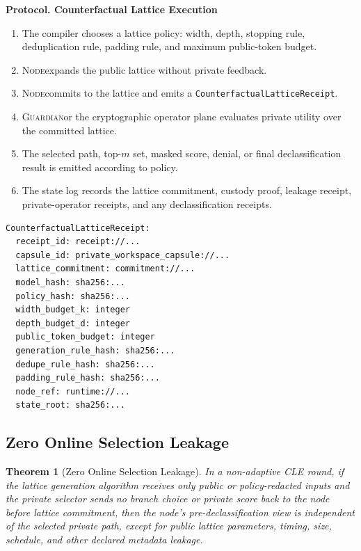 \documentclass[11pt]{article}
\newtheorem{theorem}{Theorem}
\newcommand{\roletext}[1]{\textnormal{\textsc{#1}}\xspace}
\newcommand{\node}{\ifmmode\mathsf{Node}\else\roletext{Node}\fi}
\newcommand{\guard}{\ifmmode\mathsf{Guardian}\else\roletext{Guardian}\fi}
\newcommand{\code}[1]{\texttt{#1}}
\newenvironment{protocol}[1]{%
  \medskip
  \noindent\textbf{Protocol. #1}\par\smallskip
  \begingroup
}{%
  \par\endgroup
  \medskip
}
\begin{document}
\begin{protocol}{Counterfactual Lattice Execution}
\begin{enumerate}[leftmargin=1.5em]
\item The compiler chooses a lattice policy: width, depth, stopping rule,
deduplication rule, padding rule, and maximum public-token budget.
\item \node expands the public lattice without private feedback.
\item \node commits to the lattice and emits a
\code{CounterfactualLatticeReceipt}.
\item \guard or the cryptographic operator plane evaluates private utility over
the committed lattice.
\item The selected path, top-\(m\) set, masked score, denial, or final
declassification result is emitted according to policy.
\item The state log records the lattice commitment, custody proof, leakage
receipt, private-operator receipts, and any declassification receipts.
\end{enumerate}
\end{protocol}

\begin{Verbatim}[fontsize=\small]
CounterfactualLatticeReceipt:
  receipt_id: receipt://...
  capsule_id: private_workspace_capsule://...
  lattice_commitment: commitment://...
  model_hash: sha256:...
  policy_hash: sha256:...
  width_budget_k: integer
  depth_budget_d: integer
  public_token_budget: integer
  generation_rule_hash: sha256:...
  dedupe_rule_hash: sha256:...
  padding_rule_hash: sha256:...
  node_ref: runtime://...
  state_root: sha256:...
\end{Verbatim}

\subsection{Zero Online Selection Leakage}

\begin{theorem}[Zero Online Selection Leakage]
In a non-adaptive CLE round, if the lattice generation algorithm receives only
public or policy-redacted inputs and the private selector sends no branch choice
or private score back to the node before lattice commitment, then the node's
pre-declassification view is independent of the selected private path, except
for public lattice parameters, timing, size, schedule, and other declared
metadata leakage.
\end{theorem}
\end{document}
